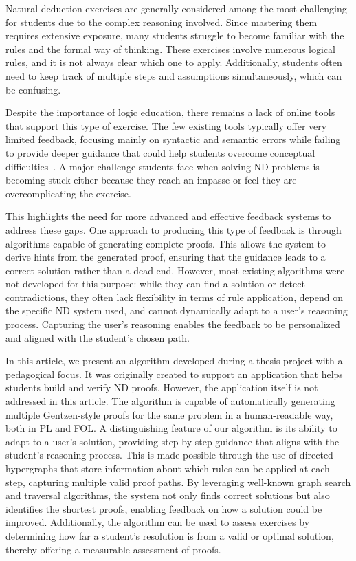 \documentclass[runningheads]{llncs}
\begin{document}
Natural deduction exercises are generally considered among the most challenging for students due to the complex reasoning involved. Since mastering them requires extensive exposure, many students struggle to become familiar with the rules and the formal way of thinking. These exercises involve numerous logical rules, and it is not always clear which one to apply. Additionally, students often need to keep track of multiple steps and assumptions simultaneously, which can be confusing.

Despite the importance of logic education, there remains a lack of online tools that support this type of exercise. The few existing tools typically offer very limited feedback, focusing mainly on syntactic and semantic errors while failing to provide deeper guidance that could help students overcome conceptual difficulties~\cite{Perh__2025}. A major challenge students face when solving ND problems is becoming stuck either because they reach an impasse or feel they are overcomplicating the exercise.

This highlights the need for more advanced and effective feedback systems to address these gaps. One approach to producing this type of feedback is through algorithms capable of generating complete proofs. This allows the system to derive hints from the generated proof, ensuring that the guidance leads to a correct solution rather than a dead end. However, most existing algorithms were not developed for this purpose: while they can find a solution or detect contradictions, they often lack flexibility in terms of rule application, depend on the specific ND system used, and cannot dynamically adapt to a user’s reasoning process. Capturing the user’s reasoning enables the feedback to be personalized and aligned with the student’s chosen path.

In this article, we present an algorithm developed during a thesis project with a pedagogical focus. It was originally created to support an application that helps students build and verify ND proofs. However, the application itself is not addressed in this article.  The algorithm is capable of automatically generating multiple Gentzen-style proofs for the same problem in a human-readable way, both in PL and FOL. A distinguishing feature of our algorithm is its ability to adapt to a user’s solution, providing step-by-step guidance that aligns with the student’s reasoning process. This is made possible through the use of directed hypergraphs that store information about which rules can be applied at each step, capturing multiple valid proof paths. By leveraging well-known graph search and traversal algorithms, the system not only finds correct solutions but also identifies the shortest proofs, enabling feedback on how a solution could be improved. Additionally, the algorithm can be used to assess exercises by determining how far a student’s resolution is from a valid or optimal solution, thereby offering a measurable assessment of proofs.
\end{document}
